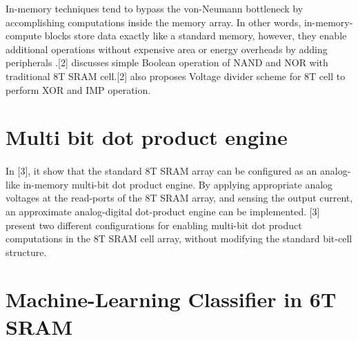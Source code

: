 In-memory techniques tend to bypass the von-Neumann bottleneck by accomplishing computations inside the memory array. In other words, in-memory-compute blocks store data exactly like a standard memory, however, they enable additional operations without expensive area or energy overheads by adding peripherals .[2] discusses simple Boolean operation of NAND and NOR with traditional 8T SRAM cell.[2] also proposes Voltage divider scheme for 8T cell to perform XOR and IMP operation.

\section{Multi bit dot product engine}
\paragraph{}

In [3], it show that the standard 8T SRAM array can be configured as an analog-like in-memory multi-bit dot product engine. By applying appropriate analog voltages at the read-ports of the 8T SRAM array, and sensing the output current, an approximate analog-digital dot-product engine can be implemented. [3] present two different configurations for enabling multi-bit dot product computations in the 8T SRAM cell array, without modifying the standard bit-cell structure. 

\section{Machine-Learning Classifier in 6T SRAM}
\paragraph{}

